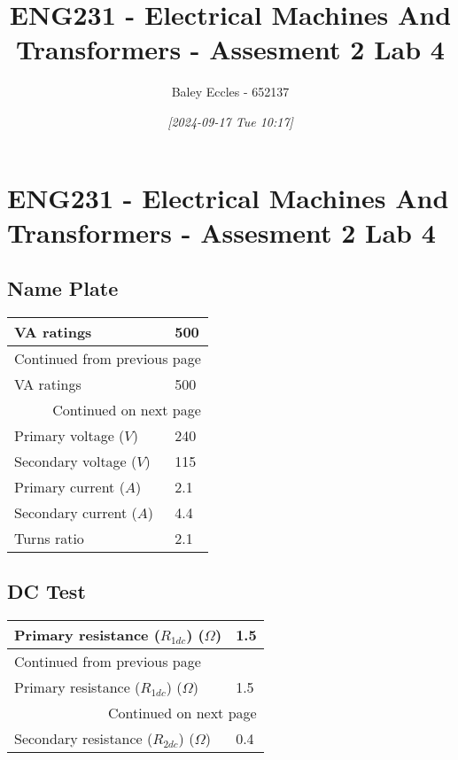 \documentclass[11pt]{article}
\author{Baley Eccles - 652137}
\date{\textit{{[}2024-09-17 Tue 10:17]}}
\title{ENG231 - Electrical Machines And Transformers - Assesment 2 Lab 4}
\begin{document}
\maketitle
\tableofcontents

\section{ENG231 - Electrical Machines And Transformers - Assesment 2 Lab 4}
\label{sec:orgfc9238e}
\subsection{Name Plate}
\label{sec:org03d8851}
\begin{longtable}{|l|l|}
\hline
VA ratings & 500\\
\hline
\endfirsthead
\multicolumn{2}{l}{Continued from previous page} \\
\hline

VA ratings & 500 \\

\hline
\endhead
\hline\multicolumn{2}{r}{Continued on next page} \\
\endfoot
\endlastfoot
\hline
Primary voltage (\(V\)) & 240\\
\hline
Secondary voltage (\(V\)) & 115\\
\hline
Primary current (\(A\)) & 2.1\\
\hline
Secondary current (\(A\)) & 4.4\\
\hline
Turns ratio & 2.1\\
\hline
\end{longtable}
\subsection{DC Test}
\label{sec:orgb6f6dce}
\begin{longtable}{|l|l|}
\hline
Primary resistance (\(R_{1dc}\)) (\(\Omega\)) & 1.5\\
\hline
\endfirsthead
\multicolumn{2}{l}{Continued from previous page} \\
\hline

Primary resistance (\(R_{1dc}\)) (\(\Omega\)) & 1.5 \\

\hline
\endhead
\hline\multicolumn{2}{r}{Continued on next page} \\
\endfoot
\endlastfoot
\hline
Secondary resistance (\(R_{2dc}\)) (\(\Omega\)) & 0.4\\
\hline
\end{longtable}
\end{document}
